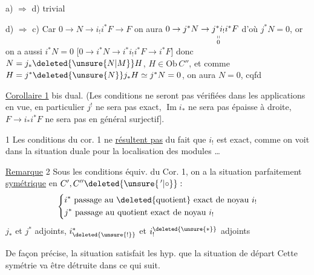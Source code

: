 


a) $\Rightarrow$ d) trivial

d) $\Rightarrow$ c) Car  $0\to N\to i_!i^*F\to F$ on aura  $0\to j^*N\to\underset{\substack{\shortparallel\\0}}{j^*i_!}i^*F$  d'où $j^*N=0$, or on a  aussi $i^*N=0$ [$0\to i^*N\to i^*i_!i^*F\to i^*F$] donc $N=j_*\deleted{\unsure{N|M}}H$, $H\in\mathrm{Ob}\,C''$, et comme $H=j^*\deleted{\unsure{N}}j_*H\simeq j^*N=0$, on aura $N=0$, cqfd


\uline{Corollaire 1} bis dual. (Les conditions  ne seront pas vérifiées dans les applications en vue, en particulier $j^!$ ne sera pas exact, $\operatorname{Im}i_*$ ne sera pas épaisse à droite, $F\to i_*i^*F$ ne sera pas en général surjectif].

\uline{} 1  Les conditions du cor. 1 ne \uline{résultent pas} du fait que $i_!$ est exact, comme on voit dans la situation duale pour la localisation des modules \ldots

\uline{Remarque} 2 Sous les conditions équiv. du Cor. 1, on a la situation
parfaitement \uline{symétrique} en $C',C''\deleted{\unsure{\, '|\circ}}:$
\[
\left\{\begin{aligned}
&i^*\ \text{passage au }\deleted{\text{quotient}}\ \text{exact de noyau } i_!\\
&j^*\ \text{passage au quotient exact de noyau }i_!
\end{aligned}\right.
\]
$j_*$ et $j^*$ adjoints, $i_{\deleted{\unsure{!}}}^*$ et $i_{\smash{!}}^{\deleted{\unsure{*}}}$ adjoints

De façon précise, la situation
satisfait les   hyp. que la situation de départ Cette symétrie va être détruite dans ce qui suit.

